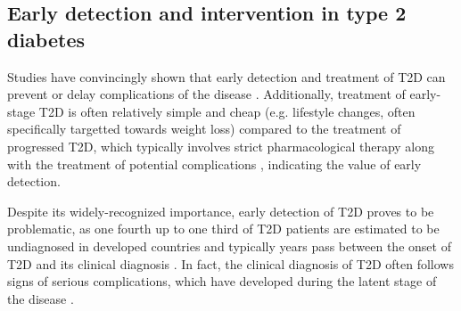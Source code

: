 \subsection{Early detection and intervention in type 2 diabetes} \label{intro:screening}
Studies have convincingly shown that early detection and treatment of T2D can prevent or delay complications of the disease \citep{haffner1990cardiovascular,engelgau2000screening, genuth2003implications, holman200810, gaede2008effect, echouffo2011screening}. Additionally, treatment of early-stage T2D is often relatively simple and cheap (e.g. lifestyle changes, often specifically targetted towards weight loss) compared to the treatment of progressed T2D, which typically involves strict pharmacological therapy along with the treatment of potential complications \citep{pan1997effects,tuomilehto2001prevention,diabetes2002reduction,zammitt2005hypoglycemia}, indicating the value of early detection.

Despite its widely-recognized importance, early detection of T2D proves to be problematic, as one fourth up to one third of T2D patients are estimated to be undiagnosed in developed countries \citep{diabetesliga, beagley2014global, american2014standards} and typically years pass between the onset of T2D and its clinical diagnosis \citep{harris1992onset}. In fact, the clinical diagnosis of T2D often follows signs of serious complications, which have developed during the latent stage of the disease \citep{rajala1998prevalence,harris2000early, hu2002elevated, american2014standards}. 


